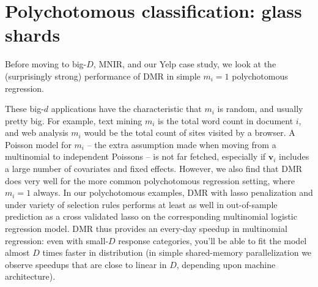 \documentclass[12pt]{article}
\newcommand{\bm}[1]{\mathbf{#1}}
\begin{document}
\section{Polychotomous classification: glass shards}
\label{FGL}

Before moving to big-$D$, MNIR, and our Yelp case study, we look at the
(surprisingly strong) performance of DMR in simple $m_i=1$ polychotomous
regression.


These big-$d$ applications have the characteristic that $m_i$ is
random, and usually pretty big.  For example, text mining $m_i$ is the total
word count in document $i$, and web analysis $m_i$ would be the total count of
sites visited by a browser.  A Poisson model for $m_i$ -- the extra assumption
made when moving from a multinomial to independent Poissons -- is not far
fetched, especially if $\bm{v}_i$ includes a large number of covariates and
fixed effects.  However, we also find that DMR does very well for the more
common polychotomous regression setting, where $m_i=1$ always.   In our
polychotomous examples, DMR with lasso penalization and under variety of
selection rules performs at least as well in out-of-sample prediction as a
cross validated lasso on the corresponding multinomial logistic regression
model.  DMR thus provides an every-day speedup in
multinomial regression: even with small-$D$ response
categories, you'll be able to fit the model almost $D$ times faster in
distribution (in simple shared-memory parallelization we observe speedups that
are close to linear in $D$, depending upon machine architecture).
\end{document}
